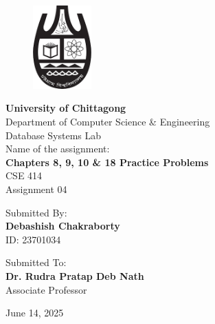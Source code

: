 \documentclass[12pt,a4paper]{article}
\begin{document}
\begin{titlepage}
    \begin{figure}[htbp]
    \centering
    \includegraphics[width=0.2\textwidth]{cu.png}
    \end{figure}
    \centering
    \vspace*{0.5cm}
    {\Huge\bfseries University of Chittagong}\\[0.5cm]
    {\Large Department of Computer Science \& Engineering}\\[0.5cm]
    {\large Database Systems Lab}\\[2cm]
    
    {\large Name of the assignment:}\\[0.3cm]
    {\LARGE\bfseries Chapters 8, 9, 10 \& 18 Practice Problems}\\[0.5cm]
    {\large CSE 414}\\[0.5cm]
    {\large Assignment 04}\\[3cm]
    
    \begin{minipage}[t]{0.4\textwidth}
    \raggedleft
    Submitted By:\\
    \large \textbf{Debashish Chakraborty}\\
    \large ID: 23701034
    \end{minipage}
    \hspace{0.05\textwidth}
    \vrule width 1pt
    \hspace{0.05\textwidth}
    \begin{minipage}[t]{0.4\textwidth}
    Submitted To:\\
    \large \textbf{Dr. Rudra Pratap Deb Nath}\\
    \large Associate Professor
    \end{minipage}
    
    \vfill
    {\large June 14, 2025}
\end{titlepage}

\newpage
\tableofcontents
\newpage 
\end{document}
